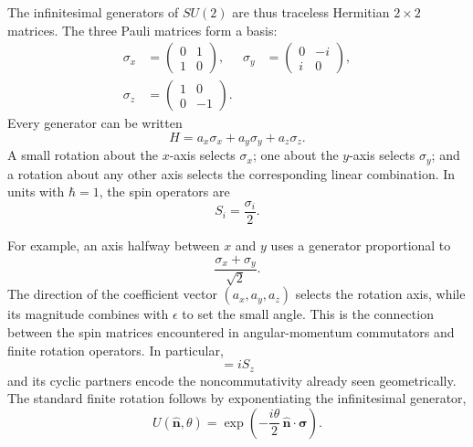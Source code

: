 The infinitesimal generators of \(SU(2)\) are thus traceless Hermitian
\(2\times2\) matrices. The three Pauli matrices form a basis:
\begin{equation}
\begin{aligned}
\sigma_x&=
\begin{pmatrix}0&1\\1&0\end{pmatrix},
&
\sigma_y&=
\begin{pmatrix}0&-i\\i&0\end{pmatrix},
\\[0.4em]
\sigma_z&=
\begin{pmatrix}1&0\\0&-1\end{pmatrix}.
\end{aligned}
\end{equation}
Every generator can be written
\begin{equation}
H=a_x\sigma_x+a_y\sigma_y+a_z\sigma_z.
\end{equation}
A small rotation about the \(x\)-axis selects \(\sigma_x\); one about the
\(y\)-axis selects \(\sigma_y\); and a rotation about any other axis selects
the corresponding linear combination. In units with \(\hbar=1\), the spin
operators are
\begin{equation}
S_i=\frac{\sigma_i}{2}.
\end{equation}

For example, an axis halfway between \(x\) and \(y\) uses a generator
proportional to
\begin{equation}
\frac{\sigma_x+\sigma_y}{\sqrt2}.
\end{equation}
The direction of the coefficient vector
\((a_x,a_y,a_z)\) selects the rotation axis, while its magnitude combines with
\(\epsilon\) to set the small angle. This is the connection between the spin
matrices encountered in angular-momentum commutators and finite rotation
operators. In particular,
\begin{equation}
[S_x,S_y]=iS_z
\end{equation}
and its cyclic partners encode the noncommutativity already seen geometrically.
The standard finite rotation follows by exponentiating the infinitesimal
generator,
\begin{equation}
U(\hat{\boldsymbol n},\theta)
=\exp\left(-\frac{i\theta}{2}\,
\hat{\boldsymbol n}\cdot\boldsymbol\sigma\right).
\end{equation}
